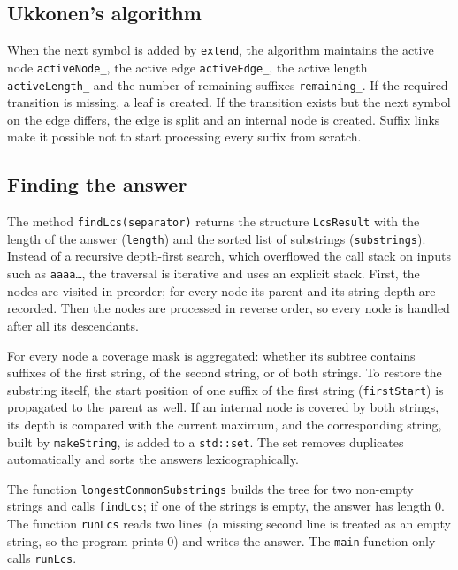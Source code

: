 \subsection{Ukkonen's algorithm}

When the next symbol is added by \texttt{extend}, the algorithm maintains the active node
\texttt{activeNode\_}, the active edge \texttt{activeEdge\_}, the active length
\texttt{activeLength\_} and the number of remaining suffixes \texttt{remaining\_}. If the required
transition is missing, a leaf is created. If the transition exists but the next symbol on the
edge differs, the edge is split and an internal node is created. Suffix links make it possible
not to start processing every suffix from scratch.

\subsection{Finding the answer}

The method \texttt{findLcs(separator)} returns the structure \texttt{LcsResult} with the length
of the answer (\texttt{length}) and the sorted list of substrings (\texttt{substrings}).
Instead of a recursive depth-first search, which overflowed the call stack on inputs such as
\texttt{aaaa\ldots}, the traversal is iterative and uses an explicit stack. First, the nodes are
visited in preorder; for every node its parent and its string depth are recorded. Then the nodes
are processed in reverse order, so every node is handled after all its descendants.

For every node a coverage mask is aggregated: whether its subtree contains suffixes of the first
string, of the second string, or of both strings. To restore the substring itself, the start
position of one suffix of the first string (\texttt{firstStart}) is propagated to the parent as
well. If an internal node is covered by both strings, its depth is compared with the current
maximum, and the corresponding string, built by \texttt{makeString}, is added to a
\texttt{std::set}. The set removes duplicates automatically and sorts the answers
lexicographically.

The function \texttt{longestCommonSubstrings} builds the tree for two non-empty strings and calls
\texttt{findLcs}; if one of the strings is empty, the answer has length 0. The function
\texttt{runLcs} reads two lines (a missing second line is treated as an empty string, so the
program prints 0) and writes the answer. The \texttt{main} function only calls \texttt{runLcs}.

